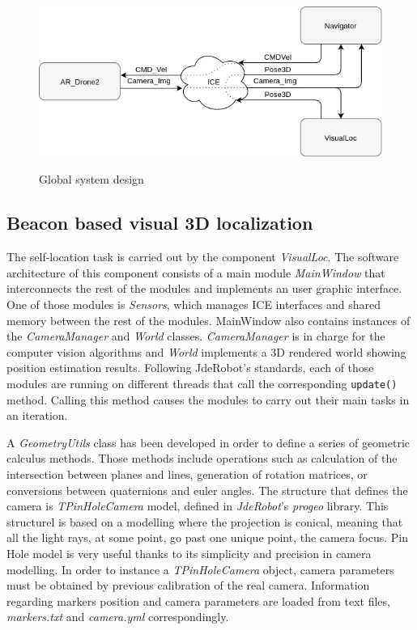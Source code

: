 \documentclass{styles/svproc}
\begin{document}
        \begin{figure}[h]
          \begin{center}
            {\includegraphics[width=\linewidth]{interactuacionproj.png}}
          \end{center}
          \caption{Global system design}
	\end{figure}
        
\subsection{Beacon based visual 3D localization}

	The self-location task is carried out by the component \textit{VisualLoc}. The software architecture of this component consists of a main module \textit{MainWindow} that interconnects the rest of the modules and implements an user graphic interface. One of those modules is \textit{Sensors}, which manages ICE interfaces and shared memory between the rest of the modules. MainWindow also contains instances of the \textit{CameraManager} and \textit{World} classes. \textit{CameraManager} is in charge for the computer vision algorithms and \textit{World} implements a 3D rendered world showing position estimation results. Following JdeRobot's standards, each of those modules are running on different threads that call the corresponding \texttt{update()} method. Calling this method causes the modules to carry out their main tasks in an iteration.
	
	A \textit{GeometryUtils} class has been developed in order to define a series of geometric calculus methods. Those methods include operations such as calculation of the intersection between planes and lines, generation of rotation matrices, or conversions between quaternions and euler angles. The structure that defines the camera is \textit{TPinHoleCamera} model, defined in \textit{JdeRobot}'s \textit{progeo} library. This structurel is based on a modelling where the projection is conical, meaning that all the light rays, at some point, go past one unique point, the camera focus. Pin Hole model is very useful thanks to its simplicity and precision in camera modelling. In order to instance a \textit{TPinHoleCamera} object, camera parameters must be obtained by previous calibration of the real camera. Information regarding markers position and camera parameters are loaded from text files, \textit{markers.txt} and \textit{camera.yml} correspondingly.
	
\end{document}

